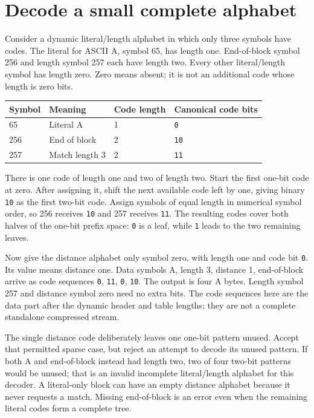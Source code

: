 \section{Decode a small complete alphabet}
Consider a dynamic literal/length alphabet in which only three symbols have codes.
The literal for ASCII A, symbol 65, has length one. End-of-block symbol 256 and length
symbol 257 each have length two. Every other literal/length symbol has length zero.
Zero means absent; it is not an additional code whose length is zero bits.

\begin{longtable}{p{23mm}p{42mm}p{25mm}p{55mm}}
\toprule Symbol & Meaning & Code length & Canonical code bits \\\midrule
65 & Literal A & 1 & \texttt{0} \\
256 & End of block & 2 & \texttt{10} \\
257 & Match length 3 & 2 & \texttt{11} \\\bottomrule
\end{longtable}
There is one code of length one and two of length two. Start the first one-bit code
at zero. After assigning it, shift the next available code left by one, giving binary
\texttt{10} as the first two-bit code. Assign symbols of equal length in numerical
symbol order, so 256 receives \texttt{10} and 257 receives \texttt{11}. The resulting
codes cover both halves of the one-bit prefix space: \texttt{0} is a leaf, while
\texttt{1} leads to the two remaining leaves.

Now give the distance alphabet only symbol zero, with length one and code bit
\texttt{0}. Its value means distance one. Data symbols A, length 3, distance 1,
end-of-block arrive as code sequences \texttt{0}, \texttt{11}, \texttt{0}, \texttt{10}.
The output is four A bytes. Length symbol 257 and distance symbol zero need no extra
bits. The code sequences here are the data part after the dynamic header and table
lengths; they are not a complete standalone compressed stream.

The single distance code deliberately leaves one one-bit pattern unused. Accept that
permitted sparse case, but reject an attempt to decode its unused pattern. If both A
and end-of-block instead had length two, two of four two-bit patterns would be unused;
that is an invalid incomplete literal/length alphabet for this decoder. A literal-only
block can have an empty distance alphabet because it never requests a match. Missing
end-of-block is an error even when the remaining literal codes form a complete tree.
